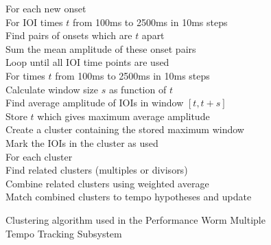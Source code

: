 \documentclass[a4paper, 11pt]{article}
\begin{document}
\begin{figure}
	\hspace{10mm} For each new onset\\
	\hspace*{20mm} For IOI times $\mathit{t}$ from 100ms to 2500ms in 10ms steps\\
	\hspace*{30mm} Find pairs of onsets which are $\mathit{t}$ apart\\
	\hspace*{30mm} Sum the mean amplitude of these onset pairs\\
	\hspace*{20mm} Loop until all IOI time points are used\\
	\hspace*{30mm} For times $\mathit{t}$ from 100ms to 2500ms in 10ms steps\\
	\hspace*{40mm} Calculate window size $\mathit{s}$ as function of $\mathit{t}$\\
	\hspace*{40mm} Find average amplitude of IOIs in window $\mathit{[t, t + s]}$\\
	\hspace*{40mm} Store $\mathit{t}$ which gives maximum average amplitude\\
	\hspace*{30mm} Create a cluster containing the stored maximum window\\
	\hspace*{30mm} Mark the IOIs in the cluster as used\\
	\hspace*{20mm} For each cluster\\
	\hspace*{30mm} Find related clusters (multiples or divisors)\\
	\hspace*{30mm} Combine related clusters using weighted average\\
	\hspace*{20mm} Match combined clusters to tempo hypotheses and update\\
	\caption{Clustering algorithm used in the Performance Worm Multiple Tempo Tracking Subsystem \cite{dixonGoeblWidmer}}
	\label{fig: clusterAl}
\end{figure}
\end{document}
